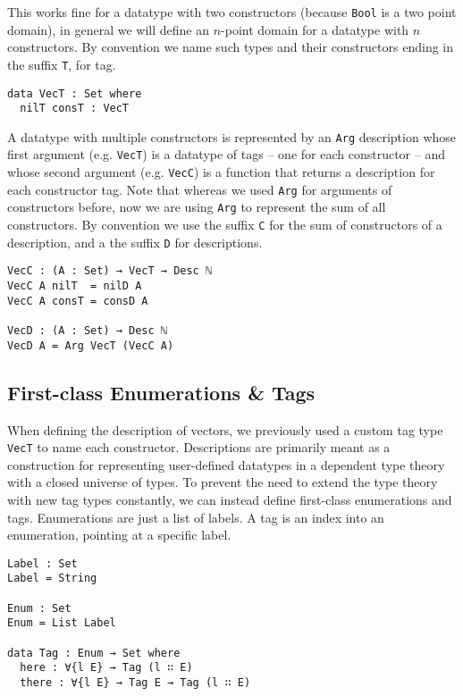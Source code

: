 \documentclass[preprint,nonatbib]{sigplanconf}
\begin{document}
This works fine for a datatype with two constructors (because {\tt Bool} is a two point domain),
in general we will define an $n$-point domain for a datatype with $n$ constructors. By
convention we name such types and their constructors ending in the suffix {\tt T}, for tag.

\begin{verbatim}
data VecT : Set where
  nilT consT : VecT
\end{verbatim}

A datatype with multiple constructors is represented by an
{\tt Arg} description whose first argument (e.g. {\tt VecT}) is a datatype of tags
-- one for each constructor -- and whose second argument (e.g. {\tt VecC}) is
a function that returns a description for each constructor tag. Note
that whereas we used {\tt Arg} for arguments of constructors before,
now we are using {\tt Arg} to represent the sum of all constructors.
By convention we use the suffix {\tt C} for the sum of constructors of
a description, and a the suffix {\tt D} for descriptions.

\begin{verbatim}
VecC : (A : Set) → VecT → Desc ℕ
VecC A nilT  = nilD A
VecC A consT = consD A

VecD : (A : Set) → Desc ℕ
VecD A = Arg VecT (VecC A)
\end{verbatim}

\subsection{First-class Enumerations \& Tags}
\label{sec:background:case}

When defining the description of vectors, we previously used a custom
tag type {\tt VecT} to name each constructor. Descriptions are
primarily meant as a construction for representing user-defined
datatypes in a dependent type theory with a closed universe of types.
To prevent the need to extend the type theory with new tag types
constantly, we can instead define first-class enumerations and tags.
Enumerations are just a list of labels. A tag is an index into an
enumeration, pointing at a specific label.

\begin{verbatim}
Label : Set
Label = String

Enum : Set
Enum = List Label

data Tag : Enum → Set where
  here : ∀{l E} → Tag (l ∷ E)
  there : ∀{l E} → Tag E → Tag (l ∷ E)
\end{verbatim}
\end{document}
